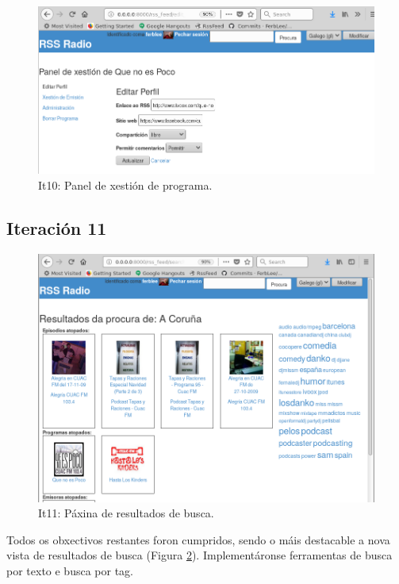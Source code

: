 \begin{figure}[h]
	\centering
	\includegraphics[scale=0.5,keepaspectratio=true]{./images/xestion_final.png}
	\caption{It10: Panel de xestión de programa.}
	\label{fig:xestionl_final}
\end{figure}


\subsection{Iteración 11}

\begin{figure}[H]
	\centering
	\includegraphics[scale=0.4,keepaspectratio=true]{./images/procura_final.png}
	\caption{It11: Páxina de resultados de busca.}
	\label{fig:procura_final}
\end{figure}

Todos os obxectivos restantes foron cumpridos, sendo o máis destacable a nova vista de resultados de busca (Figura \ref{fig:procura_final}). Implementáronse ferramentas de busca por texto e busca por tag.

